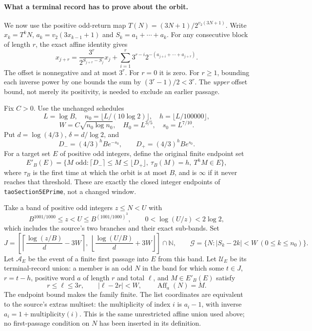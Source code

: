 \documentclass[11pt]{article}
\theoremstyle{remark}\newtheorem{remark}[proposition]{Remark}
\begin{document}
\paragraph{What a terminal record has to prove about the orbit.}
We now use the positive odd-return map
$T(N)=(3N+1)/2^{v_2(3N+1)}$.
Write $x_k=T^kN$, $a_k=v_2(3x_{k-1}+1)$ and
$S_k=a_1+\cdots+a_k$. For any consecutive block of length $r$,
the exact affine identity gives
\begin{equation}
 x_{j+r}=\frac{3^r}{2^{S_{j+r}-S_j}}x_j+
 \sum_{i=1}^r3^{r-i}2^{-(a_{j+i}+\cdots+a_{j+r})}.
 \label{eq:mazur-actual-block}
\end{equation}
The offset is nonnegative and at most $3^r$.
For $r=0$ it is zero. For $r\ge1$, bounding each inverse power
by one bounds the sum by $(3^r-1)/2<3^r$.
The \emph{upper} offset bound, not merely its positivity,
is needed to exclude an earlier passage.

Fix $C>0$. Use the unchanged schedules
\[
 L=\log B,\quad n_0=\lfloor L/(10\log2)\rfloor,\quad
 h=\lfloor L/100000\rfloor,
\]
\[
 W=C\sqrt{n_0\log n_0},\quad H_0=L^{3/5},\quad s_0=L^{7/10}.
\]
Put $d=\log(4/3)$, $\delta=d/\log2$, and
\[
 D_-=(4/3)^hB e^{-s_0},\qquad D_+=(4/3)^hB e^{s_0}.
\]
For a target set $E$ of positive odd integers, define the original
finite endpoint set
\[
 E'_B(E)=
 \{M\text{ odd}:\lceil D_-\rceil\le M\le\lfloor D_+\rfloor,\
       \tau_B(M)=h,\ T^hM\in E\},
\]
where $\tau_B$ is the first time at which the orbit is at most $B$,
and is $\infty$ if it never reaches that threshold.
These are exactly the closed integer endpoints of
\texttt{taoSection5EPrime}, not a changed window.

Take a band of positive odd integers $z\le N<U$ with
\[
 B^{1001/1000}\le z<U\le B^{(1001/1000)^3},
 \qquad 0<\log(U/z)<2\log2,
\]
which includes the source's two branches and their exact sub-bands.
Set
\[
 J=\left[\left\lceil\frac{\log(z/B)}d-3W\right\rceil,\
          \left\lfloor\frac{\log(U/B)}d+3W\right\rfloor\right]
        \cap\mathbb N,\qquad
 \mathcal G=\{N:|S_k-2k|<W\ (0\le k\le n_0)\}.
\]
Let $\mathcal A_E$ be the event of a finite first passage into $E$
from this band. Let $\mathcal U_E$ be its terminal-record union:
a member is an odd $N$ in the band for which some $t\in J$,
$r=t-h$, positive word $a$ of length $r$ and total $\ell$, and
$M\in E'_B(E)$ satisfy
\[
 r\le\ell\le3r,\qquad |\ell-2r|<W,\qquad
 \operatorname{Aff}_a(N)=M.
\]
The endpoint bound makes the family finite. The list coordinates are
equivalent to the source's extras multiset: the multiplicity of index
$i$ is $a_i-1$, with inverse $a_i=1+\text{multiplicity}(i)$.
This is the same unrestricted affine union used above;
no first-passage condition on $N$ has been inserted in its definition.
\end{document}
